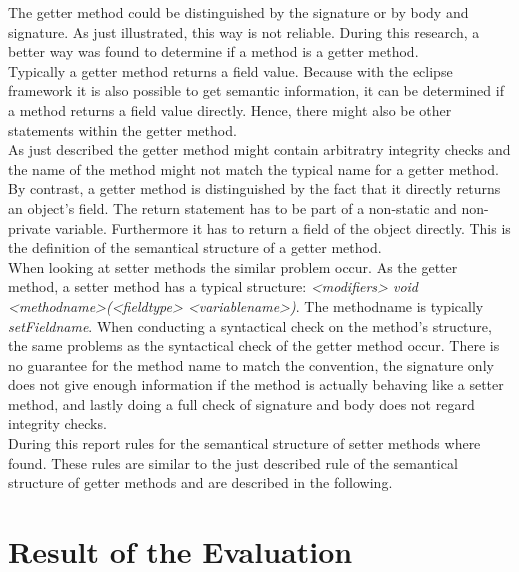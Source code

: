 The getter method could be distinguished by the signature or by body and signature. As just illustrated, this way is not reliable. During this research, a better way was found to determine if a method is a getter method. 
\\

Typically a getter method returns a field value. Because with the eclipse framework it is also possible to get semantic information, it can be determined if a method returns a field value directly. Hence, there might also be other statements within the getter method. 
\\

As just described the getter method might contain arbitratry integrity checks and the name of the method might not match the typical name for a getter method. By contrast, a getter method is distinguished by the fact that it directly returns an object's field. The return statement has to be part of a non-static and non-private variable. Furthermore it has to return a field of the object directly. This is the definition of the semantical structure of a getter method.
\\

When looking at setter methods the similar problem occur. As the getter method, a setter method has a typical structure: \textit{<modifiers> void <methodname>(<fieldtype> <variablename>)}. The methodname is typically \textit{setFieldname}. When conducting a syntactical check on the method's structure, the same problems as the syntactical check of the getter method occur. There is no guarantee for the method name to match the convention, the signature only does not give enough information if the method is actually behaving like a setter method, and lastly doing a full check of signature and body does not regard integrity checks.
\\

During this report rules for the semantical structure of setter methods where found. These rules are similar to the just described rule of the semantical structure of getter methods and are described in the following.


\section{Result of the Evaluation}
\label{e:result}
